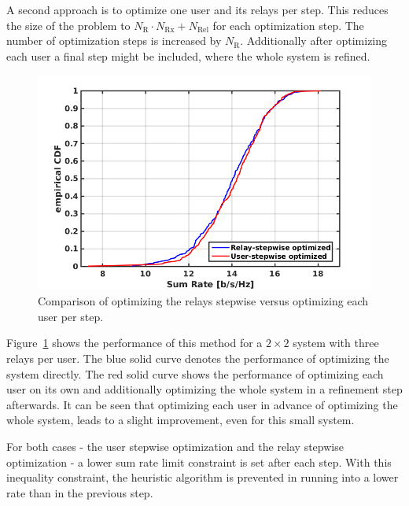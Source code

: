 A second approach is to optimize one user and its relays per step.
This reduces the size of the problem to $N_\text{R}\cdot N_\text{Rx}+N_\text{Rel}$ for each optimization step.
The number of optimization steps is increased by $N_\text{R}$.
Additionally after optimizing each user a final step might be included, where the whole system is refined.
\begin{figure}[h]
\centering
  \includegraphics[width=0.9\linewidth]{images/stepwise_comparison.png}
\caption{Comparison of optimizing the relays stepwise versus optimizing each user per step.}
\label{fig:uservsrelay_stepwise}
\end{figure}

Figure~\ref{fig:uservsrelay_stepwise} shows the performance of this method for a $2\times2$ system with three relays per user.
The blue solid curve denotes the performance of optimizing the system directly.
The red solid curve shows the performance of optimizing each user on its own and additionally optimizing the whole system in a refinement step afterwards.
It can be seen that optimizing each user in advance of optimizing the whole system, leads to a slight improvement, even for this small system.

For both cases - the user stepwise optimization and the relay stepwise optimization - a lower sum rate limit constraint is set after each step.
With this inequality constraint, the heuristic algorithm is prevented in running into a lower rate than in the previous step.






